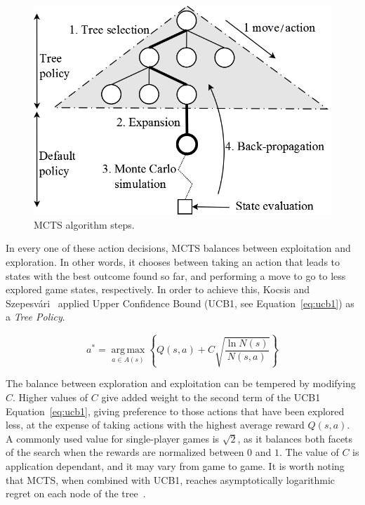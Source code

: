 \documentclass[journal]{IEEEtran}
\newcommand{\argmax}{\operatorname*{arg\,max}}
\begin{document}
\begin{figure} [!t]
	\begin{center}
	\includegraphics[scale=0.4,natwidth=708,natheight=484]{figures/perez1.png}
	\caption{MCTS algorithm steps.}
	\label{fig:mcts}
	\end{center}
\end{figure}

In every one of these action decisions, MCTS balances between exploitation and exploration. In other words, it chooses between taking an action that leads to states with the best outcome found so far, and performing a move to go to less explored game states, respectively. In order to achieve this, Kocsis and Szepesv\'{a}ri~\cite{kocsis2006bandit} applied Upper Confidence Bound (UCB1, see Equation~\ref{eq:ucb1}) as a \textit{Tree Policy}. 

\begin{equation}	\label{eq:ucb1}
a^* = \argmax_{a \in A(s)} \left\{Q(s,a) + C \sqrt{\frac{ \ln N(s) }{ N(s,a) }}\right\}
\end{equation}

The balance between exploration and exploitation can be tempered by modifying $C$. Higher values of $C$ give added weight to the second term of the UCB1 Equation~\ref{eq:ucb1}, giving preference to those actions that have been explored less, at the expense of taking actions with the highest average reward $Q(s,a)$. A commonly used value for single-player games is $\sqrt{2}$, as it balances both facets of the search when the rewards are normalized between $0$ and $1$. The value of $C$ is application dependant, and it may vary from game to game. It is worth noting that MCTS, when combined with UCB1, reaches asymptotically logarithmic regret on each node of the tree~\cite{coquelin2007bandit}. 
\end{document}
